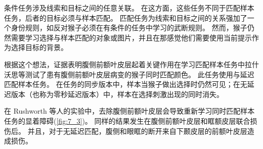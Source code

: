 条件任务涉及线索和目标之间的任意关联。 
在这方面，这些任务不同于匹配样本任务，后者的目标必须与样本匹配。
匹配任务为线索和目标之间的关系强加了一个身份规则，如反对猴子必须在有条件的任务中学习的武断规则。 
然而，猴子仍然需要学习选择与样本匹配的对象或图片，并且在那感觉他们需要使用当前提示作为选择目标的背景。
\par


根据这个想法，证据表明腹侧前额叶皮层起着关键作用在学习匹配样本任务中拉什沃思等\cite{rushworth1997ventral}测试了患有腹侧前额叶皮层病变的猴子同时匹配颜色。 
此任务使用与延迟匹配样本任务。 
在任务的同步版本中，样本当猴子做出选择时仍然可见；在无延迟版本（也称为零秒延迟版本）中，样本在选择刺激出现的同时消失。
\par


在 Rushworth 等人的实验中，去除腹侧前额叶皮层会导致重新学习同时匹配样本任务的显着障碍(\ref{fig:7_3})。
同样的结果发生在腹侧前额叶皮层和眶额皮层联合损伤后\cite{bussey2001role}。
并且，对于无延迟匹配，腹侧和眼眶的断开来自下颞皮层的前额叶皮层造成损伤\cite{bussey2002interaction}。
\par


